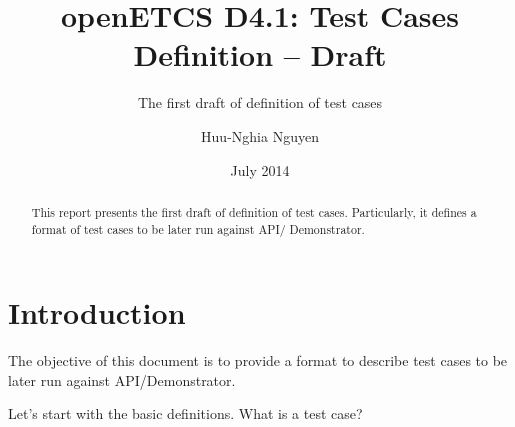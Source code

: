 \documentclass{./template/openetcs_report}
\begin{document}
\frontmatter
{}




\title{openETCS D4.1: Test Cases Definition -- Draft}

\subtitle{The first draft of definition of test cases}

\date{July 2014}

\author{Huu-Nghia Nguyen}





\begin{abstract}
This report presents the first draft of definition of test cases.
Particularly, it defines a format of test cases 
to be later run against API/ Demonstrator.
\end{abstract}

\maketitle
\tableofcontents
\listoffiguresandtables

\mainmatter

\chapter{Introduction}

The objective of this document is to provide a format to describe test
cases to be later run against API/Demonstrator.

Let's start with the basic definitions. What is a test case?
\end{document}
